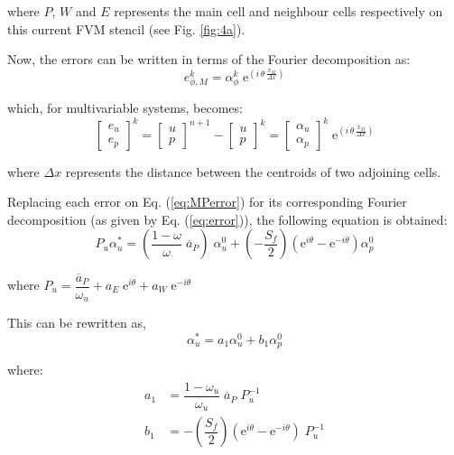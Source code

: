 \documentclass[final,3p,times,11pt,onecolumn]{myElsarticle}
\numberwithin{equation}{section}
\begin{document}
\noindent where $P$, $W$ and $E$ represents the main cell and neighbour cells respectively on this current FVM stencil (see Fig. \ref{fig:4a}).

Now, the errors can be written in terms of the Fourier decomposition as:
\begin{equation}
    e^k_{\phi,M} = \alpha^k_{\phi} \; \text{e}^{\left( i \, \theta \, \frac{x_M}{\Delta x}\right)}
    \label{eq:error}
\end{equation}

\noindent which, for multivariable systems, becomes:
\begin{equation}
\begin{bmatrix}
e_u \\
e_p 
\end{bmatrix}^{k}
=
\begin{bmatrix}
u \\
p 
\end{bmatrix}^{n+1}
-\begin{bmatrix}
u \\
p 
\end{bmatrix}^{k}
=
\begin{bmatrix}
\alpha_u \\
\alpha_p 
\end{bmatrix}^{k}
\; \text{e}^{\left( i \, \theta \, \frac{x_M}{\Delta x}\right)}
\label{eq:fou1}
\end{equation}

\noindent where $\Delta x$ represents the distance between the centroids of two adjoining cells. 

Replacing each error on Eq. (\ref{eq:MPerror}) for its corresponding Fourier decomposition (as given by Eq. (\ref{eq:error})), the following equation is obtained:
\begin{equation}
    P_u \alpha_u^* = \left( \dfrac{1-\omega}{\omega} \; \overline{a}_P \right) \; \alpha_u^0 + \left(- \dfrac{S_f}{2} \right) \left(\text{e}^{i \theta} -  \text{e}^{-i \theta} \right) \alpha_p^0
    \label{eq:MPfou}
\end{equation}

\noindent where $P_u = \dfrac{\overline{a}_P}{\omega_u}  + a_E \; \text{e}^{i \theta} + a_W \; \text{e}^{-i \theta}$

This can be rewritten as,
\begin{equation}
     \alpha_u^* = a_1 \alpha_u^0 + b_1 \alpha_p^0
    \label{eq:MPfou2}
\end{equation}

\noindent where:
\begin{equation}
\begin{split}
     a_1 &= \dfrac{1-\omega_u}{\omega_u} \; \overline{a}_P \; P_u^{-1} \\
     b_1 &= - \left( \dfrac{S_f}{2} \right) \left( \text{e}^{i \theta} -  \text{e}^{-i \theta} \right) \; P_u^{-1}
\end{split}
\end{equation}
\end{document}
